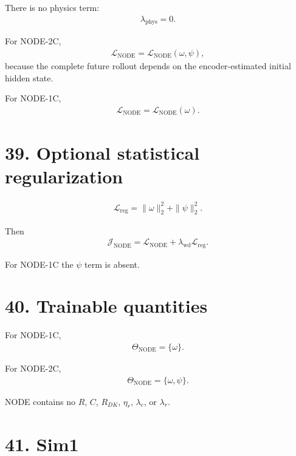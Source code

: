 \documentclass[11pt]{article}
\begin{document}
There is no physics term:
\begin{align}
\boxed{\lambda_{\mathrm{phys}}=0.}
\tag{N3.133}
\end{align}

For NODE-2C,
\begin{align}
\boxed{
\mathcal L_{\mathrm{NODE}}
=
\mathcal L_{\mathrm{NODE}}(\omega,\psi),
}
\tag{N3.134}
\end{align}
because the complete future rollout depends on the encoder-estimated initial hidden state.

For NODE-1C,
\begin{align}
\boxed{
\mathcal L_{\mathrm{NODE}}
=
\mathcal L_{\mathrm{NODE}}(\omega).
}
\tag{N3.135}
\end{align}

\section*{39. Optional statistical regularization}

\begin{align}
\boxed{
\mathcal L_{\mathrm{reg}}
=
\|\omega\|_2^2+\|\psi\|_2^2.
}
\tag{N3.136}
\end{align}

Then
\begin{align}
\boxed{
\mathcal J_{\mathrm{NODE}}
=
\mathcal L_{\mathrm{NODE}}
+
\lambda_{\mathrm{wd}}\mathcal L_{\mathrm{reg}}.
}
\tag{N3.137}
\end{align}

For NODE-1C the \(\psi\) term is absent.

\section*{40. Trainable quantities}

For NODE-1C,
\begin{align}
\boxed{
\Theta_{\mathrm{NODE}}=\{\omega\}.
}
\tag{N3.138}
\end{align}

For NODE-2C,
\begin{align}
\boxed{
\Theta_{\mathrm{NODE}}=\{\omega,\psi\}.
}
\tag{N3.139}
\end{align}

NODE contains no \(R\), \(C\), \(R_{DK}\), \(\eta_r\), \(\lambda_c\), or \(\lambda_r\).

\section*{41. Sim1}
\end{document}
